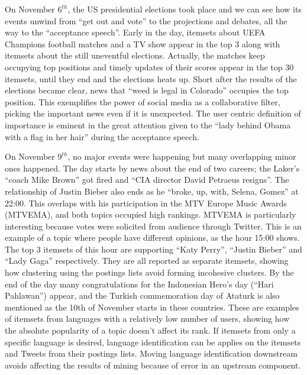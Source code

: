 \documentclass{sig-alternate}
\begin{document}
On November $6^{th}$, the US presidential elections took place and we can see how its events unwind from ``get out and vote'' to the projections and debates, all the way to the ``acceptance speech''. Early in the day, itemsets about UEFA Champions football matches and a TV show appear in the top 3 along with itemsets about the still uneventful elections. Actually, the matches keep occupying top positions and timely updates of their scores appear in the top 30 itemsets, until they end and the elections heats up. Short after the results of the elections became clear, news that ``weed is legal in Colorado'' occupies the top position. This exemplifies the power of social media as a collaborative filter, picking the important news even if it is unexpected. The user centric definition of importance is eminent in  the great attention given to the ``lady behind Obama  with a flag in her hair'' during the acceptance speech. 

On November $9^{th}$, no major events were happening but many overlapping minor ones happened. The day starts by news about the end of two careers; the Laker's ``coach Mike Brown'' got fired  and ``CIA director David Petraeus resigns''. The relationship of Justin Bieber also ends as he ``broke, up, with, Selena, Gomez'' at 22:00. This overlaps with his participation in the MTV Europe Music Awards (MTVEMA), and both topics occupied high rankings. MTVEMA is particularly interesting because votes were solicited from audience through Twitter. This is an example of a topic where people have different opinions, as the hour 15:00 shows. The top 3 itemsets of this hour are supporting ``Katy  Perry'', ``Justin Bieber'' and ``Lady Gaga'' respectively. They are all reported as separate itemsets, showing how clustering using the postings lists avoid forming incohesive clusters.
By the end of the day many congratulations for the Indonesian Hero's day (``Hari Pahlawan'') appear, and the Turkish commemoration day of Ataturk is also mentioned as the 10th of November starts in these countries. These are examples of itemsets from languages with a relatively low number of users, showing how the absolute popularity of a topic doesn't affect its rank. If itemsets from only a specific language is desired, language identification can be applies on the itemsets and Tweets from their postings lists. Moving language identification downstream avoids affecting the results of mining because of error in an upstream component.
\end{document}
